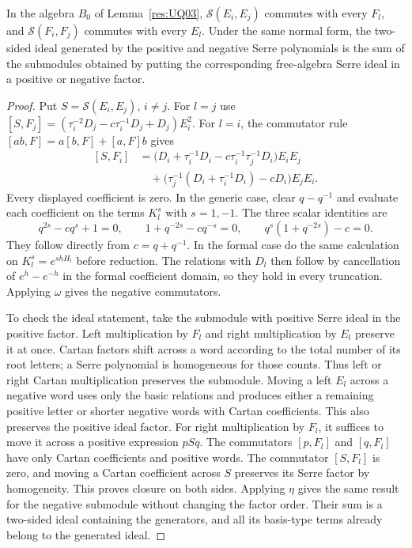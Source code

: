 \begin{lemma}
\label{res:UQ04}
In the algebra \(B_0\) of Lemma~\ref{res:UQ03},
\(\mathcal S(E_i,E_j)\) commutes with every \(F_l\), and
\(\mathcal S(F_i,F_j)\) commutes with every \(E_l\).
Under the same normal form, the two-sided ideal generated
by the positive and negative Serre polynomials is the sum
of the submodules obtained by putting the corresponding
free-algebra Serre ideal in a positive or negative factor.
\end{lemma}
\begin{proof}
Put \(S=\mathcal S(E_i,E_j)\), \(i\ne j\).
For \(l=j\) use
\(
 [S,F_j]=(\tau_i^{-2}D_j-c\tau_i^{-1}D_j+D_j)E_i^2.
\)
For \(l=i\), the commutator rule
\([ab,F]=a[b,F]+[a,F]b\) gives
\[
\begin{split}
 [S,F_i]
 &=\bigl(D_i+\tau_i^{-1}D_i-c\tau_i^{-1}\tau_j^{-1}D_i\bigr)E_iE_j\\
 &\quad+\bigl(\tau_j^{-1}(D_i+\tau_i^{-1}D_i)-cD_i\bigr)E_jE_i .
\end{split}
\]
Every displayed coefficient is zero. In the generic case,
clear \(q-q^{-1}\) and evaluate each coefficient on
the terms \(K_l^s\) with \(s=1,-1\).
The three scalar identities are
\[
 q^{2s}-c q^s+1=0,\qquad
 1+q^{-2s}-c q^{-s}=0,\qquad
 q^s(1+q^{-2s})-c=0 .
\]
They follow directly from \(c=q+q^{-1}\).
In the formal case do the same calculation on
\(K_l^s=e^{shH_l}\) before reduction.
The relations with \(D_l\) then follow by cancellation
of \(e^h-e^{-h}\) in the formal coefficient domain,
so they hold in every truncation. Applying \(\omega\)
gives the negative commutators.

To check the ideal statement, take the submodule with
positive Serre ideal in the positive factor. Left
multiplication by \(F_l\) and right multiplication by \(E_l\)
preserve it at once. Cartan factors shift across a word
according to the total number of its root letters; a Serre
polynomial is homogeneous for those counts.
Thus left or right Cartan multiplication preserves
the submodule. Moving a left \(E_l\) across a negative
word uses only the basic relations and produces either
a remaining positive letter or shorter negative words
with Cartan coefficients. This also preserves the positive
ideal factor. For right multiplication by \(F_l\), it
suffices to move it across a positive expression \(pSq\).
The commutators \([p,F_l]\) and \([q,F_l]\) have only
Cartan coefficients and positive words. The commutator
\([S,F_l]\) is zero, and moving a Cartan coefficient
across \(S\) preserves its Serre factor by homogeneity.
This proves closure on both sides. Applying \(\eta\) gives
the same result for the negative submodule without changing
the factor order. Their sum is a two-sided ideal containing
the generators, and all its basis-type terms already
belong to the generated ideal.
\end{proof}

